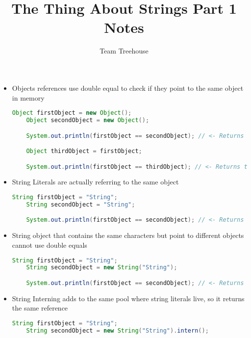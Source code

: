 \documentclass[12pt]{article}
\begin{document}
\title{The Thing About Strings Part 1 Notes}
\author{Team Treehouse}
\maketitle

\begin{itemize}
    \item Objects references use double equal to check if they point to the same
    object in memory

    \begin{lstlisting}[language=Java, caption={lesson\_01/Explore1.java}]
    Object firstObject = new Object();
    Object secondObject = new Object();

    System.out.println(firstObject == secondObject); // <- Returns false

    Object thirdObject = firstObject;

    System.out.println(firstObject == thirdObject); // <- Returns true
    \end{lstlisting}

    \item String Literals are actually referring to the same object

    \begin{lstlisting}[language=Java, caption={lesson\_01/Explore2.java}]
    String firstObject = "String";
    String secondObject = "String";

    System.out.println(firstObject == secondObject); // <- Returns true
    \end{lstlisting}

    \item String object that contains the same characters but point to different
    objects cannot use double equals

    \begin{lstlisting}[language=Java, caption={lesson\_01/Explore3.java}]
    String firstObject = "String";
    String secondObject = new String("String");

    System.out.println(firstObject == secondObject); // <- Returns false
    \end{lstlisting}

    \item String Interning adds to the same pool where string literals live, so
    it returns the same reference

    \begin{lstlisting}[language=Java, caption={lesson\_01/Explore4.java}]
    String firstObject = "String";
    String secondObject = new String("String").intern();


\end{lstlisting}
\end{itemize}
\end{document}
